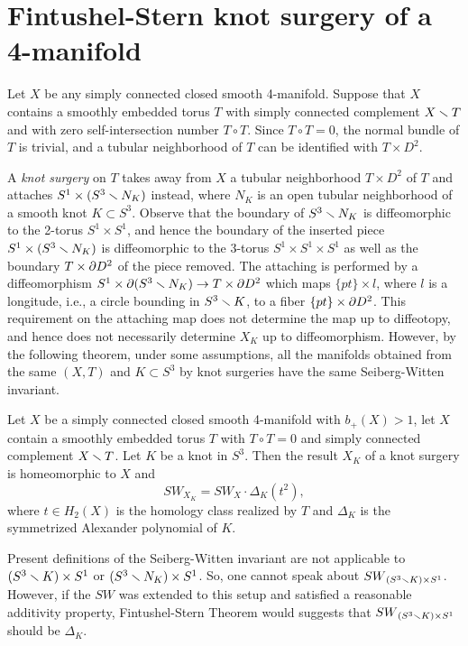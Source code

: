 \documentclass{article}
\begin{document}
\section{Fintushel-Stern knot surgery of a 4-manifold}\label{s3}
Let $X$ be any simply connected closed smooth 4-manifold. 
Suppose that $X$ contains a smoothly embedded torus $T$ with simply 
connected complement $X\smallsetminus T$ and with zero
self-intersection number $T\circ T$.  Since $T\circ T=0$,
the normal bundle of $T$ is trivial, and a tubular neighborhood of $T$
can be identified with  $T\times D^2$. 

A {\em knot surgery\/} on $T$ takes away from $X$ a tubular neighborhood 
$T\times D^2$ of $T$  and attaches $S^1\times(S^3\smallsetminus N_K)$ instead,  
where $N_K$ is an open tubular neighborhood of a smooth knot $K\subset S^3$.
Observe that the boundary of $S^3\smallsetminus N_K$ is diffeomorphic to the 2-torus
$S^1\times S^1$, and hence the boundary of the inserted
 piece $S^1\times(S^3\smallsetminus N_K)$ is diffeomorphic to
the 3-torus $S^1\times S^1\times S^1$ as well as the boundary 
$T\times\partial D^2$ of the piece removed. The attaching is performed by a 
diffeomorphism $S^1\times\partial(S^3\smallsetminus N_K)\to T\times\partial D^2$ which maps 
$\{pt\}\times l$, where $l$ is a longitude, 
i.e., a circle bounding in $ S^3\smallsetminus K$, to a fiber $\{pt\}\times\partial D^2$. 
This requirement on the attaching 
map does not determine the map up to diffeotopy, and hence does not 
necessarily determine
$X_K$ up to diffeomorphism. However, by the following theorem, under 
some assumptions, all the 
manifolds obtained from the same $(X,T)$ and $K\subset S^3$ by knot 
surgeries have the same Seiberg-Witten invariant.

\begin{Th}\label{ThFS} Let $X$ be a 
simply connected closed smooth 4-manifold with $b_+(X)>1$, let $X$
contain  a smoothly embedded torus $T$ with $T\circ T=0$ and simply
connected complement $X\smallsetminus T$. Let  $K$ be a knot in $S^3$. Then the
result $X_K$ of a knot surgery is
homeomorphic to $X$ and 
$$
{SW}_{X_K}={SW}_X\cdot \Delta_K(t^2),
$$
 where $t\in H_2(X)$ is the homology class realized by $T$ and
$\Delta_K$ is the symmetrized Alexander polynomial of $K$.
\end{Th}

Present definitions of the Seiberg-Witten invariant are not applicable to 
$(S^3\smallsetminus K)\times S^1$ or $(S^3\smallsetminus N_K)\times S^1$.
So, one cannot speak about ${SW}_{(S^3\smallsetminus K)\times S^1}$.
However, if the ${SW}$ was extended to this setup and satisfied 
a reasonable additivity property, Fintushel-Stern Theorem would  
suggests that ${SW}_{(S^3\smallsetminus K)\times S^1}$ should be $\Delta_K$.
\end{document}
